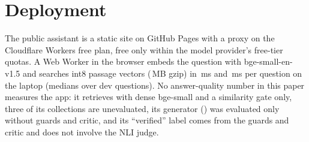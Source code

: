 \section{Deployment}
\label{sec:deploy}

The public assistant is a static site on GitHub Pages with a proxy on the Cloudflare Workers free plan, free only within the model provider's free-tier quotas. A Web Worker in the browser embeds the question with bge-small-en-v1.5 and searches  int8 passage vectors (\,MB gzip) in \,ms and \,ms per question on the laptop (medians over  dev questions).
No answer-quality number in this paper measures the app: it retrieves with dense bge-small and a similarity gate only, three of its collections are unevaluated, its generator (\gptoss{}) was evaluated only without guards and critic, and its ``verified'' label comes from the guards and critic and does not involve the NLI judge.
